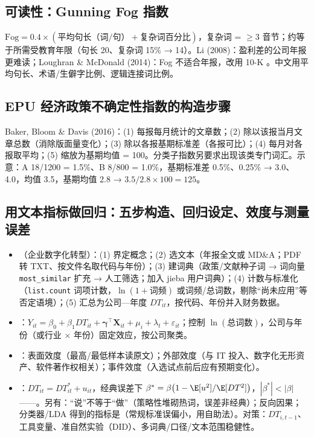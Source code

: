 \subsection{可读性：Gunning Fog 指数}
$\text{Fog}=0.4\times(\text{平均句长（词/句）}+\text{复杂词百分比})$，复杂词 = $\ge3$ 音节；约等于所需受教育年限（句长 20、复杂词 15\% → 14）。Li (2008)：盈利差的公司年报更难读；Loughran \& McDonald (2014)：Fog 不适合年报，改用 10-K 。中文用平均句长、术语/生僻字比例、逻辑连接词比例。

\subsection{EPU 经济政策不确定性指数的构造步骤}
Baker, Bloom \& Davis (2016)：(1) 每报每月统计的文章数；(2) 除以该报当月文章总数（消除版面量变化）；(3) 除以各报基期标准差（各报可比）；(4) 每月对各报取平均；(5) 缩放为基期均值 = 100。分类子指数另要求出现该类专门词汇。示意：A 18/1200 = 1.5\%、B 8/800 = 1.0\%，基期标准差 0.5\%、0.25\% → 3.0、4.0，均值 3.5，基期均值 2.8 → $3.5/2.8\times100=125$。

\subsection{用文本指标做回归：五步构造、回归设定、效度与测量误差}
\begin{itemize}
\item {}（企业数字化转型）：(1) 界定概念；(2) 选文本（年报全文或 MD\&A；PDF 转 TXT、按文件名取代码与年份）；(3) 建词典（政策/文献种子词 → 词向量 \texttt{most\_similar} 扩充 → 人工筛选；加入 jieba 用户词典）；(4) 计数与标准化（\texttt{list.count} 词项计数，$\ln(1+\text{词频})$ 或词频/总词数，剔除“尚未应用”等否定语境）；(5) 汇总为公司—年度 $DT_{it}$，按代码、年份并入财务数据。
\item {}：$Y_{it}=\beta_0+\beta_1DT_{it}+\bm\gamma^\top\bm X_{it}+\mu_i+\lambda_t+\varepsilon_{it}$；控制 $\ln(\text{总词数})$，公司与年份（或行业 × 年份）固定效应，按公司聚类。
\item {}：表面效度（最高/最低样本读原文）；外部效度（与 IT 投入、数字化无形资产、软件著作权相关）；事件效度（入选试点前后应有预期变化）。
\item {}：$DT_{it}=DT^*_{it}+u_{it}$，经典误差下 $\beta^*=\beta\bigl(1-\E[u^2]/\E[DT^2]\bigr)$，$|\beta^*|<|\beta|$——。另有：“说”不等于“做”（策略性堆砌热词，误差非经典）；反向因果；分类器/LDA 得到的指标是（常规标准误偏小，用自助法）。对策：$DT_{i,t-1}$、工具变量、准自然实验（DID）、多词典/口径/文本范围稳健性。
\end{itemize}

